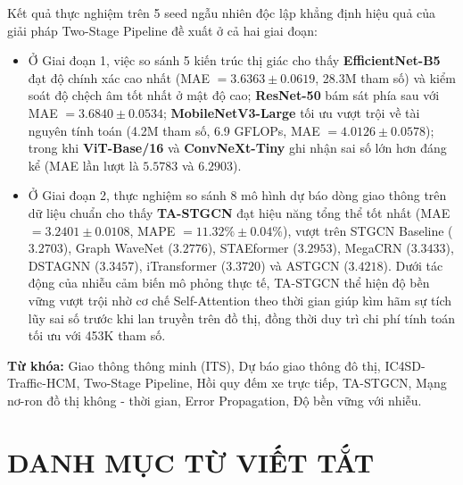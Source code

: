 \documentclass[12pt,a4paper,oneside]{report}
\begin{document}
Kết quả thực nghiệm trên 5 seed ngẫu nhiên độc lập khẳng định hiệu quả của giải pháp Two-Stage Pipeline đề xuất ở cả hai giai đoạn:
\begin{itemize}
    \item Ở Giai đoạn 1, việc so sánh 5 kiến trúc thị giác cho thấy \textbf{EfficientNet-B5} đạt độ chính xác cao nhất (MAE $= 3.6363 \pm 0.0619$, 28.3M tham số) và kiểm soát độ chệch âm tốt nhất ở mật độ cao; \textbf{ResNet-50} bám sát phía sau với MAE $= 3.6840 \pm 0.0534$; \textbf{MobileNetV3-Large} tối ưu vượt trội về tài nguyên tính toán (4.2M tham số, 6.9 GFLOPs, MAE $= 4.0126 \pm 0.0578$); trong khi \textbf{ViT-Base/16} và \textbf{ConvNeXt-Tiny} ghi nhận sai số lớn hơn đáng kể (MAE lần lượt là $5.5783$ và $6.2903$).
    \item Ở Giai đoạn 2, thực nghiệm so sánh 8 mô hình dự báo dòng giao thông trên dữ liệu chuẩn cho thấy \textbf{TA-STGCN} đạt hiệu năng tổng thể tốt nhất (MAE $= 3.2401 \pm 0.0108$, MAPE $= 11.32\% \pm 0.04\%$), vượt trên STGCN Baseline ($3.2703$), Graph WaveNet ($3.2776$), STAEformer ($3.2953$), MegaCRN ($3.3433$), DSTAGNN ($3.3457$), iTransformer ($3.3720$) và ASTGCN ($3.4218$). Dưới tác động của nhiễu cảm biến mô phỏng thực tế, TA-STGCN thể hiện độ bền vững vượt trội nhờ cơ chế Self-Attention theo thời gian giúp kìm hãm sự tích lũy sai số trước khi lan truyền trên đồ thị, đồng thời duy trì chi phí tính toán tối ưu với 453K tham số.
\end{itemize}

\vspace{0.5cm}
\noindent \textbf{Từ khóa:} Giao thông thông minh (ITS), Dự báo giao thông đô thị, IC4SD-Traffic-HCM, Two-Stage Pipeline, Hồi quy đếm xe trực tiếp, TA-STGCN, Mạng nơ-ron đồ thị không - thời gian, Error Propagation, Độ bền vững với nhiễu.

\newpage
\tableofcontents

\newpage
\listoftables
{}

\newpage
\listoffigures
{}

\newpage
\chapter*{DANH MỤC TỪ VIẾT TẮT}
\end{document}
